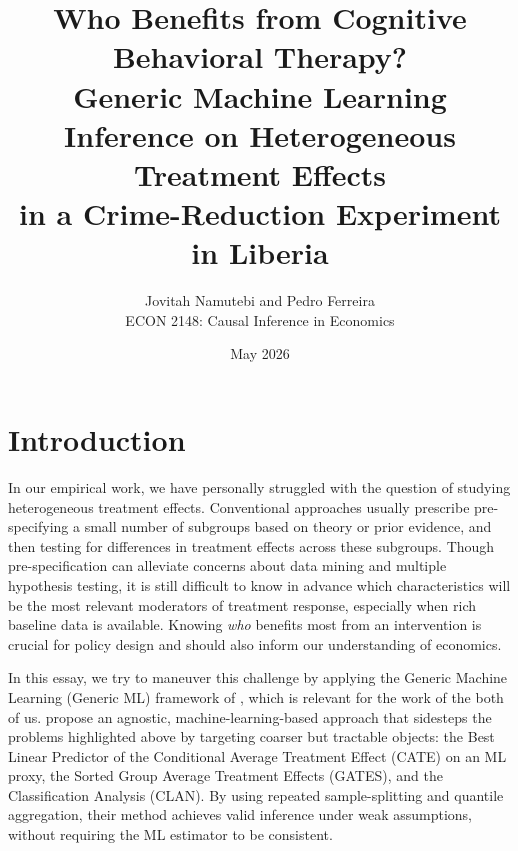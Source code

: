 \documentclass[11pt]{article}
\title{\textbf{Who Benefits from Cognitive Behavioral Therapy?} \\
\large Generic Machine Learning Inference on Heterogeneous Treatment Effects \\
in a Crime-Reduction Experiment in Liberia}
\author{Jovitah Namutebi and Pedro Ferreira \\ \small ECON 2148: Causal Inference in Economics} %
\date{May 2026}
\begin{document}
\maketitle

\section{Introduction}

In our empirical work, we have personally struggled with the question of studying heterogeneous treatment effects. Conventional approaches usually prescribe pre-specifying a small number of subgroups based on theory or prior evidence, and then testing for differences in treatment effects across these subgroups. Though pre-specification can alleviate concerns about data mining and multiple hypothesis testing, it is still difficult to know in advance which characteristics will be the most relevant moderators of treatment response, especially when rich baseline data is available.
Knowing \textit{who} benefits most from an intervention is crucial for policy design and should also inform our understanding of economics.

In this essay, we try to maneuver this challenge by applying the Generic Machine Learning (Generic ML) framework of \citet{chernozhukov2025}, which is relevant for the work of the both of us.
\citet{chernozhukov2025} propose an agnostic, machine-learning-based approach
that sidesteps the problems highlighted above by targeting coarser but tractable
objects: the Best Linear Predictor of the Conditional Average Treatment Effect (CATE) on an ML proxy, the Sorted
Group Average Treatment Effects (GATES), and the Classification Analysis
(CLAN). By using repeated sample-splitting and quantile aggregation, their
method achieves valid inference under weak assumptions, without requiring the
ML estimator to be consistent.
\end{document}
